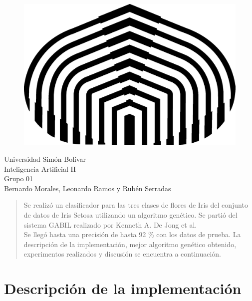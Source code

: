 \documentclass[a4paper,10pt]{article}
\begin{document}
\begin{flushleft}
\begin{figure}
 \includegraphics[scale=0.4]{logo}
\end{figure}
 Universidad Simón Bolívar\\
 Inteligencia Artificial II\\
 Grupo 01 \\
 Bernardo Morales, Leonardo Ramos y Rubén Serradas\\
\end{flushleft}

\begin{abstract}

\indent Se realizó un clasificador para las tres clases de flores de Iris del conjunto de datos de Iris Setosa
utilizando un algoritmo genético. Se partió  del sistema GABIL realizado por Kenneth A. De Jong et al.\\
\indent Se llegó hasta una precisión de hasta 92 \% con los datos de prueba. La descripción de la implementación,
mejor algoritmo genético obtenido, experimentos realizados y discusión se encuentra a continuación.

\end{abstract}

\section{Descripción de la implementación}
\end{document}

